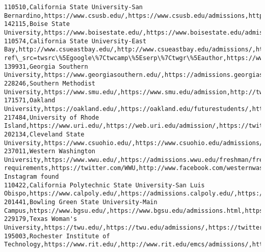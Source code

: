 \documentclass[11pt]{article}
\begin{document}
\begin{Verbatim}[commandchars=\\\{\}]
110510,California State University-San Bernardino,https://www.csusb.edu/,https://www.csusb.edu/admissions,http://www.twitter.com/csusbnews,http://www.facebook.com/CSUSB,https://instagram.com/csusb
142115,Boise State University,https://www.boisestate.edu/,https://www.boisestate.edu/admissions/,https://twitter.com/boisestatelive,https://www.facebook.com/BoiseStateLive,https://www.instagram.com/boisestateuniversity/
110574,California State University-East Bay,http://www.csueastbay.edu/,http://www.csueastbay.edu/admissions/,https://twitter.com/CalStateEastBay?ref\_src=twsrc\%5Egoogle\%7Ctwcamp\%5Eserp\%7Ctwgr\%5Eauthor,https://www.facebook.com/CalStateEastBay/,https://www.instagram.com/csueb/
139931,Georgia Southern University,https://www.georgiasouthern.edu/,https://admissions.georgiasouthern.edu/,http://twitter.com/georgiasouthern,https://www.facebook.com/GeorgiaSouthern,http://instagram.com/georgiasouthernuniversity
228246,Southern Methodist University,https://www.smu.edu/,https://www.smu.edu/admission,http://twitter.com/smu/,http://facebook.com/smudallas,http://www.instagram.com/smudallas
171571,Oakland University,https://oakland.edu/,https://oakland.edu/futurestudents/,https://twitter.com/oaklandu,https://www.facebook.com/oaklandu/,https://www.instagram.com/oaklandu/
217484,University of Rhode Island,https://www.uri.edu/,https://web.uri.edu/admission/,https://twitter.com/universityofri,https://www.facebook.com/universityofri,https://www.instagram.com/universityofri/
202134,Cleveland State University,https://www.csuohio.edu/,https://www.csuohio.edu/admissions/admissions,https://twitter.com/CLE\_State,http://www.facebook.com/clevelandstateuniversity,http://instagram.com/cle\_state
237011,Western Washington University,https://www.wwu.edu/,https://admissions.wwu.edu/freshman/freshman-requirements,https://twitter.com/WWU,http://www.facebook.com/westernwashingtonuniversity,No Instagram found
110422,California Polytechnic State University-San Luis Obispo,https://www.calpoly.edu/,https://admissions.calpoly.edu/,https://twitter.com/calpoly,https://www.facebook.com/CalPoly,https://www.instagram.com/cal\_poly
201441,Bowling Green State University-Main Campus,https://www.bgsu.edu/,https://www.bgsu.edu/admissions.html,https://www.twitter.com/bgsu,https://www.facebook.com/OfficialBGSU/,https://www.instagram.com/officialbgsu/
229179,Texas Woman's University,https://twu.edu/,https://twu.edu/admissions/,https://twitter.com/txwomans,https://www.facebook.com/TexasWomansUniversity/,https://www.instagram.com/txwomans/
195003,Rochester Institute of Technology,https://www.rit.edu/,http://www.rit.edu/emcs/admissions/,https://twitter.com/RITNEWS,https://www.facebook.com/RITNews,http://instagram.com/RITTigers

\end{Verbatim}
\end{document}

